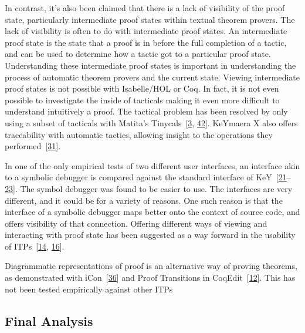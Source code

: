 \documentclass[
]{article}
\begin{document}
In contrast, it's also been claimed that there is a lack of visibility
of the proof state, particularly intermediate proof states within
textual theorem provers. The lack of visibility is often to do with
intermediate proof states. An intermediate proof state is the state that
a proof is in before the full completion of a tactic, and can be used to
determine how a tactic got to a particular proof state. Understanding
these intermediate proof states is important in understanding the
process of automatic theorem provers and the current state. Viewing
intermediate proof states is not possible with Isabelle/HOL or Coq. In
fact, it is not even possible to investigate the inside of tacticals
making it even more difficult to understand intuitively a proof. The
tactical problem has been resolved by only using a subset of tacticals
with Matita's Tinycals~{[}\protect\hyperlink{ref-asperti_user_2007}{3},
\protect\hyperlink{ref-zacchiroli_user_2007}{42}{]}. KeYmaera X also
offers traceability with automatic tactics, allowing insight to the
operations they
performed~{[}\protect\hyperlink{ref-mitsch_keymaera_2017}{31}{]}.

In one of the only empirical tests of two different user interfaces, an
interface akin to a symbolic debugger is compared against the standard
interface of
KeY~{[}\protect\hyperlink{ref-hentschel_empirical_2016}{21}--\protect\hyperlink{ref-hentschel_interactive_2016}{23}{]}.
The symbol debugger was found to be easier to use. The interfaces are
very different, and it could be for a variety of reasons. One such
reason is that the interface of a symbolic debugger maps better onto the
context of source code, and offers visibility of that connection.
Offering different ways of viewing and interacting with proof state has
been suggested as a way forward in the usability of
ITPs~{[}\protect\hyperlink{ref-eastaughffe_support_1998}{14},
\protect\hyperlink{ref-grebing_seamless_2020}{16}{]}.

Diagrammatic representations of proof is an alternative way of proving
theorems, as demonstrated with
iCon~{[}\protect\hyperlink{ref-shams_accessible_2018}{36}{]} and Proof
Transitions in
CoqEdit~{[}\protect\hyperlink{ref-berman_development_2014}{12}{]}. This
has not been tested empirically against other ITPs

\hypertarget{final-analysis}{%
\subsection{Final Analysis}\label{final-analysis}}
\end{document}
